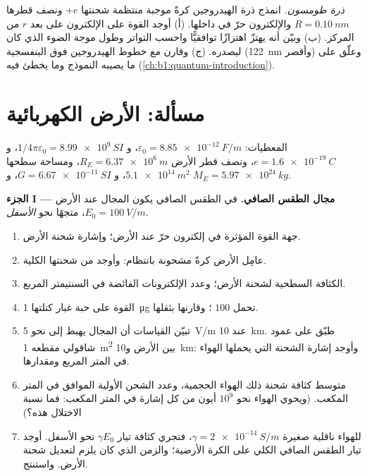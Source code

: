 \begin{exercise}[$\star\star\star$]\label{exo:b1:electrostatics-gauss:12}
\emph{ذرة طومسون.} انمذج ذرة الهيدروجين كرةً موجبة
منتظمة شحنتها $+e$ ونصف قطرها $R = \qty{0.10}{nm}$ والإلكترون
حرّ في داخلها. (أ) أوجد القوة على الإلكترون على بعد $r$ من المركز.
(ب) وبيّن أنه يهتزّ اهتزازًا توافقيًّا واحسب التواتر
وطول موجة الضوء الذي كان ليصدره. (ج) وقارن مع
خطوط الهيدروجين فوق البنفسجية (\qty{122}{nm} وأقصر) وعلّق على
ما يصيبه النموذج وما يخطئ فيه (\cref{ch:b1:quantum-introduction}).
\end{exercise}

\section{مسألة: الأرض الكهربائية}

\begin{problem}
\label{pb:b1:electrostatics-gauss:1}
المعطيات: $\varepsilon_0 = \qty{8.85e-12}{F/m}$، و $1/4\pi\varepsilon_0 = \qty{8.99e9}{SI}$،
و $e = \qty{1.6e-19}{C}$، ونصف قطر الأرض $R_E = \qty{6.37e6}{m}$، ومساحة سطحها
$\qty{5.1e14}{m^2}$، و $G = \qty{6.67e-11}{SI}$، و $M_E = \qty{5.97e24}{kg}$.

\medskip
\noindent\textbf{الجزء I --- مجال الطقس الصافي.}
في الطقس الصافي يكون المجال عند الأرض $E_0 = \qty{100}{V/m}$،
متجهًا نحو \emph{الأسفل}.
\begin{enumerate}
  \item جهة القوة المؤثرة في إلكترون حرّ عند الأرض؛ وإشارة
        شحنة الأرض.
  \item عامِل الأرض كرةً مشحونة بانتظام: وأوجد من 
        شحنتها الكلية.
  \item الكثافة السطحية لشحنة الأرض؛ وعدد الإلكترونات الفائضة
        في السنتيمتر المربع.
  \item القوة على حبة غبار كتلتها \qty{1}{\micro g} تحمل $100$
        ؛ وقارنها بثقلها.
  \item تبيّن القياسات أن المجال يهبط إلى نحو \qty{5}{V/m} عند
        \qty{10}{km}. طبّق  على عمود شاقولي مقطعه
        \qty{1}{m^2} بين الأرض و\qty{10}{km}: وأوجد إشارة
        الشحنة التي يحملها الهواء في المتر المربع ومقدارها.
  \item متوسط كثافة شحنة ذلك الهواء الحجمية، وعدد الشحن الأولية
        الموافق في المتر المكعب. (ويحوي الهواء
        نحو $10^9$ أيون من كل إشارة في المتر المكعب: فما نسبة
        الاختلال هذه؟)
  \item للهواء ناقلية صغيرة $\gamma = \qty{2e-14}{S/m}$، فتجري
        كثافة تيار $\gamma E_0$ نحو الأسفل. أوجد تيار الطقس الصافي
        الكلي على الكرة الأرضية؛ والزمن الذي كان يلزم لتعديل
        شحنة الأرض. واستنتج.
\end{enumerate}


\end{problem}
